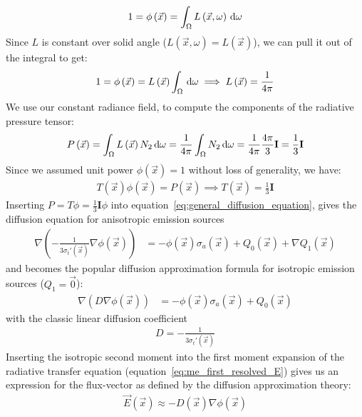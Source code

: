 \begin{align*}
1 = \phi\left(\vec{x}\right) = \int_\Omega{L\left(\vec{x}, \omega\right)\,\mathrm{d}\omega}
\end{align*}
Since $L$ is constant over solid angle ($L(\vec{x}, \omega)=L(\vec{x})$), we can pull it out of the integral to get:
\begin{align*}
1 = \phi\left(\vec{x}\right) = L\left(\vec{x}\right)\int_\Omega{\,\mathrm{d}\omega}\implies L\left(\vec{x}\right) = \frac{1}{4\pi}
\end{align*}
We use our constant radiance field, to compute the components of the radiative pressure tensor:
\begin{align*}
P\left(\vec{x}\right) 
= \int_\Omega{L\left(\vec{x}\right)N_2\,\mathrm{d}\omega}
= \frac{1}{4\pi}\int_\Omega{N_2\,\mathrm{d}\omega}
= \frac{1}{4\pi}\frac{4\pi}{3}\mathbf{I}
= \frac{1}{3}\mathbf{I}
\end{align*}
Since we assumed unit power $\phi(\vec{x})=1$ without loss of generality, we have:
\begin{align*}
T(\vec{x})\phi(\vec{x}) = P(\vec{x}) \implies T(\vec{x})=\frac{1}{3}\mathbf{I}
\end{align*}
Inserting $P=T\phi=\frac{1}{3}\mathbf{I}\phi$ into equation~\ref{eq:general_diffusion_equation}, gives the diffusion equation for anisotropic emission sources
\begin{align}
\label{eq:diffusion_equation_anisotropic_Q}
\nabla
\left(
-\frac{1}{3\sigma_t'\left(\vec{x}\right)}
\nabla \phi\left(\vec{x}\right)
\right)&=
-\phi(\vec{x})\sigma_a(\vec{x})
+Q_0\left(\vec{x}\right)
+\nabla Q_1\left(\vec{x}\right)
\end{align}
and becomes the popular diffusion approximation formula for isotropic emission sources ($Q_1=\vec{0}$):
\begin{align}
\label{eq:diffusion_equation_anisotropic_Q}
\nabla
\left(
D
\nabla \phi\left(\vec{x}\right)
\right)&=
-\phi(\vec{x})\sigma_a(\vec{x})
+Q_0\left(\vec{x}\right)
\end{align}
with the classic linear diffusion coefficient
\begin{align}
D=-\frac{1}{3\sigma_t'\left(\vec{x}\right)}
\label{eq:da_D}
\end{align}
Inserting the isotropic second moment into the first moment expansion of the radiative transfer equation (equation~\ref{eq:me_first_resolved_E}) gives us an expression for the flux-vector as defined by the diffusion approximation theory:
\begin{align}
\label{eq:diffusion_ficks_law}
\vec{E}\left(\vec{x}\right) \approx -D\left(\vec{x}\right)\nabla\phi\left(\vec{x}\right)
\end{align}
